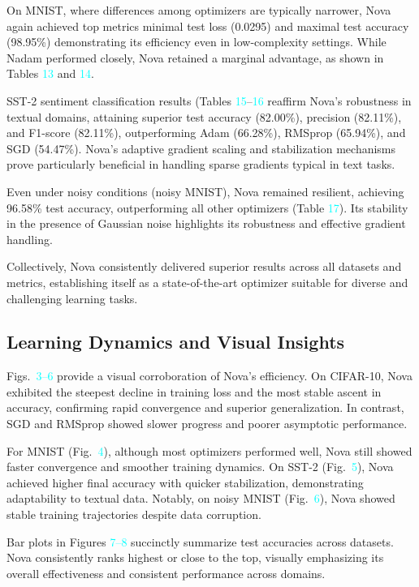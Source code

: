 \documentclass[10pt,twocolumn]{article}
\begin{document}
On MNIST, where differences among optimizers are typically narrower, Nova again achieved top metrics minimal test loss (0.0295) and maximal test accuracy (98.95\%) demonstrating its efficiency even in low-complexity settings. While Nadam performed closely, Nova retained a marginal advantage, as shown in Tables \textcolor{cyan}{13} and \textcolor{cyan}{14}.

SST-2 sentiment classification results (Tables \textcolor{cyan}{15}--\textcolor{cyan}{16} reaffirm Nova's robustness in textual domains, attaining superior test accuracy (82.00\%), precision (82.11\%), and F1-score (82.11\%), outperforming Adam (66.28\%), RMSprop (65.94\%), and SGD (54.47\%). Nova’s adaptive gradient scaling and stabilization mechanisms prove particularly beneficial in handling sparse gradients typical in text tasks.

Even under noisy conditions (noisy MNIST), Nova remained resilient, achieving 96.58\% test accuracy, outperforming all other optimizers (Table \textcolor{cyan}{17}). Its stability in the presence of Gaussian noise highlights its robustness and effective gradient handling.

Collectively, Nova consistently delivered superior results across all datasets and metrics, establishing itself as a state-of-the-art optimizer suitable for diverse and challenging learning tasks.

\subsection{Learning Dynamics and Visual Insights}

Figs.~\textcolor{cyan}{3--6} provide a visual corroboration of Nova’s efficiency. On CIFAR-10, Nova exhibited the steepest decline in training loss and the most stable ascent in accuracy, confirming rapid convergence and superior generalization. In contrast, SGD and RMSprop showed slower progress and poorer asymptotic performance.

For MNIST (Fig.~\textcolor{cyan}{4}), although most optimizers performed well, Nova still showed faster convergence and smoother training dynamics. On SST-2 (Fig.~\textcolor{cyan}{5}), Nova achieved higher final accuracy with quicker stabilization, demonstrating adaptability to textual data. Notably, on noisy MNIST (Fig.~\textcolor{cyan}{6}), Nova showed stable training trajectories despite data corruption.

Bar plots in Figures \textcolor{cyan}{7--8}  succinctly summarize test accuracies across datasets. Nova consistently ranks highest or close to the top, visually emphasizing its overall effectiveness and consistent performance across domains.
\end{document}
